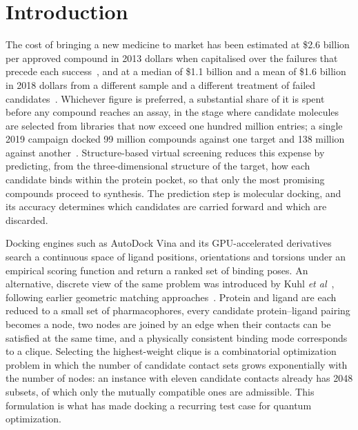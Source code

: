\documentclass{iopjournal}
\begin{document}
\section{Introduction}
\label{sec:intro}

The cost of bringing a new medicine to market has been estimated at \$2.6 billion per approved compound in 2013 dollars when capitalised over the failures that precede each success~\cite{dimasi2016cost}, and at a median of \$1.1 billion and a mean of \$1.6 billion in 2018 dollars from a different sample and a different treatment of failed candidates~\cite{wouters2020cost}. Whichever figure is preferred, a substantial share of it is spent before any compound reaches an assay, in the stage where candidate molecules are selected from libraries that now exceed one hundred million entries; a single 2019 campaign docked 99 million compounds against one target and 138 million against another~\cite{lyu2019ultralarge}. Structure-based virtual screening reduces this expense by predicting, from the three-dimensional structure of the target, how each candidate binds within the protein pocket, so that only the most promising compounds proceed to synthesis. The prediction step is molecular docking, and its accuracy determines which candidates are carried forward and which are discarded.

Docking engines such as AutoDock Vina and its GPU-accelerated derivatives~\cite{trott2010vina,tang2022vinagpu,ding2023vinagpu2,tang2024vinagpu21} search a continuous space of ligand positions, orientations and torsions under an empirical scoring function and return a ranked set of binding poses. An alternative, discrete view of the same problem was introduced by Kuhl \textit{et al}~\cite{kuhl1984combinatorial}, following earlier geometric matching approaches~\cite{kuntz1982geometric}. Protein and ligand are each reduced to a small set of pharmacophores, every candidate protein--ligand pairing becomes a node, two nodes are joined by an edge when their contacts can be satisfied at the same time, and a physically consistent binding mode corresponds to a clique. Selecting the highest-weight clique is a combinatorial optimization problem in which the number of candidate contact sets grows exponentially with the number of nodes: an instance with eleven candidate contacts already has 2048 subsets, of which only the mutually compatible ones are admissible. This formulation is what has made docking a recurring test case for quantum optimization.
\end{document}
